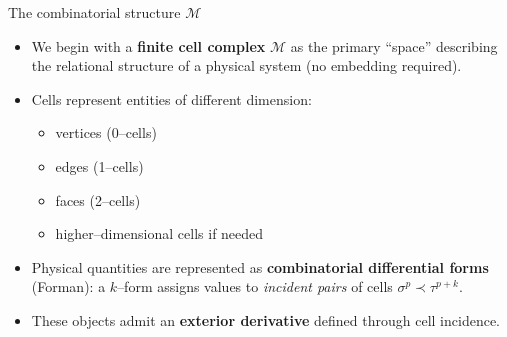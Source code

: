 \begin{frame}{The combinatorial structure $\mathcal{M}$}

\begin{itemize}

\item We begin with a \textbf{finite cell complex} $\mathcal{M}$ as the primary “space” describing the relational structure of a physical system (no embedding required).
\vspace{0.2cm}

\item Cells represent entities of different dimension:
\begin{itemize}
\item vertices (0–cells)
\item edges (1–cells)
\item faces (2–cells)
\item higher–dimensional cells if needed
\end{itemize}
\vspace{0.2cm}

\item Physical quantities are represented as \textbf{combinatorial differential forms} (Forman):
a $k$–form assigns values to \emph{incident pairs} of cells $\sigma^{p} \prec \tau^{p+k}$.
\vspace{0.2cm}

\item These objects admit an \textbf{exterior derivative} defined through cell incidence.

\end{itemize}

\end{frame}


